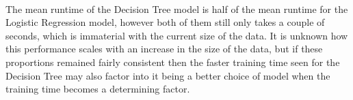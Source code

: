 \documentclass[12pt, letterpaper]{article}
\begin{document}
\paragraph{}
The mean runtime of the Decision Tree model is half of the mean runtime for the Logistic Regression model, however both of them still only takes a couple of seconds, which is immaterial with the current size of the data. It is unknown how this performance scales with an increase in the size of the data, but if these proportions remained fairly consistent then the faster training time seen for the Decision Tree may also factor into it being a better choice of model when the training time becomes a determining factor.


 

\end{document}
